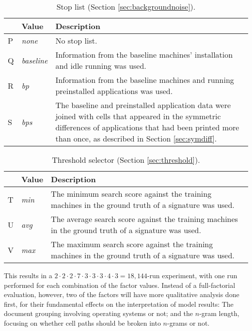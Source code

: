 \documentclass[11pt]{ucthesis}
\theoremstyle{plain}
\theoremstyle{definition}
\begin{document}
\begin{table}[htp]
\begin{small}
\caption{\label{tbl:paramenum:stoplist}Stop list (Section \ref{sec:backgroundnoise}).}
\begin{center}
\begin{tabular}{llp{4in}}
\toprule
 & Value & Description \\
\midrule
P & \emph{none} & No stop list. \\
Q & \emph{baseline} & Information from the baseline machines' installation and idle running was used. \\
R & \emph{bp} & Information from the baseline machines and running preinstalled applications was used. \\
S & \emph{bps} & The baseline and preinstalled application data were joined with cells that appeared in the symmetric differences of applications that had been printed more than once, as described in Section \ref{sec:symdiff}. \\
\bottomrule
\end{tabular}
\end{center}
\end{small}
\end{table}

\begin{table}[htp]
\begin{small}
\caption{\label{tbl:paramenum:threshold}Threshold selector (Section \ref{sec:threshold}).}
\begin{center}
\begin{tabular}{llp{4in}}
\toprule
 & Value & Description \\
\midrule
T & \emph{min} & The minimum search score against the training machines in the ground truth of a signature was used. \\
U & \emph{avg} & The average search score against the training machines in the ground truth of a signature was used. \\
V & \emph{max} & The maximum search score against the training machines in the ground truth of a signature was used. \\
\bottomrule
\end{tabular}
\end{center}
\end{small}
\end{table}

This results in a $2 \cdot 2 \cdot 2 \cdot 7 \cdot 3 \cdot 3 \cdot 3 \cdot 4 \cdot 3 = 18,144$-run experiment, with one run performed for each combination of the factor values.  Instead of a full-factorial evaluation, however, two of the factors will have more qualitative analysis done first, for their fundamental effects on the interpretation of model results: The document grouping involving operating systems or not; and the $n$-gram length, focusing on whether cell paths should be broken into $n$-grams or not.
\end{document}
